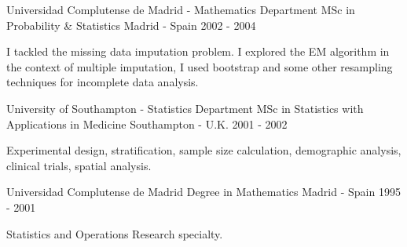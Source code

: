 \begin{cventries}
\cventry
{Universidad Complutense de Madrid - Mathematics Department} %
{MSc in Probability \& Statistics} %
{Madrid - Spain} %
{2002 - 2004} %
{ %
\begin{cvitems}
\item {
I tackled the missing data imputation problem. 
I explored the EM algorithm in the context of multiple imputation,
I used bootstrap and some other resampling techniques for incomplete data analysis.
}
\end{cvitems}
}

\cventry
{University of Southampton - Statistics Department} %
{MSc in Statistics with Applications in Medicine} %
{Southampton - U.K.} %
{2001 - 2002} %
{ %
\begin{cvitems}
\item {Experimental design, stratification, sample size calculation, demographic analysis, clinical trials, spatial analysis.}
\end{cvitems}
}

\cventry
{Universidad Complutense de Madrid} %
{Degree in Mathematics} %
{Madrid - Spain} %
{1995 - 2001} %
{ %
\begin{cvitems}
\item {Statistics and Operations Research specialty.}
\end{cvitems}
}



\end{cventries}
